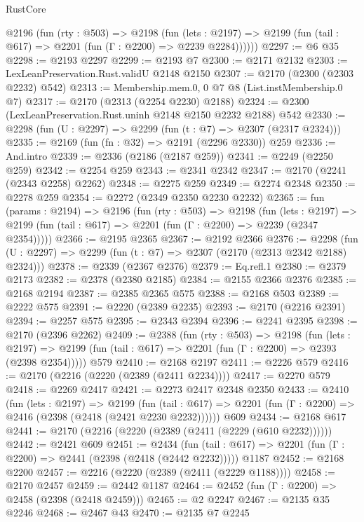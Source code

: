 \begin{lexlean}{RustCore}
\begin{coremodule}
      @2196
        (fun (rty : @503) =>
        @2198
          (fun (lets : @2197) =>
          @2199 (fun (tail : @617) => @2201 (fun (Γ : @2200) => @2239 @2284))))))
@2297 := @6 @35
@2298 := @2193 @2297
@2299 := @2193 @7
@2300 := @2171 @2132
@2303 := LexLeanPreservation.Rust.validU @2148 @2150
@2307 := @2170 (@2300 (@2303 @2232) @542)
@2313 := Membership.mem.{0, 0} @7 @8 (List.instMembership.{0} @7)
@2317 := @2170 (@2313 (@2254 @2230) @2188)
@2324 := @2300 (LexLeanPreservation.Rust.uninh @2148 @2150 @2232 @2188) @542
@2330 := @2298 (fun (U : @2297) => @2299 (fun (t : @7) => @2307 (@2317 @2324)))
@2335 := @2169 (fun (fn : @32) => @2191 (@2296 @2330)) @259
@2336 := And.intro
@2339 := @2336 (@2186 (@2187 @259))
@2341 := @2249 (@2250 @259)
@2342 := @2254 @259
@2343 := @2341 @2342
@2347 := @2170 (@2241 (@2343 @2258) @2262)
@2348 := @2275 @259
@2349 := @2274 @2348
@2350 := @2278 @259
@2354 := @2272 (@2349 @2350 @2230 @2232)
@2365 := fun (params : @2194) =>
  @2196
    (fun (rty : @503) =>
    @2198
      (fun (lets : @2197) =>
      @2199 (fun (tail : @617) => @2201 (fun (Γ : @2200) => @2239 (@2347 @2354)))))
@2366 := @2195 @2365
@2367 := @2192 @2366
@2376 := @2298 (fun (U : @2297) => @2299 (fun (t : @7) => @2307 (@2170 (@2313 @2342 @2188) @2324)))
@2378 := @2339 (@2367 @2376)
@2379 := Eq.refl.{1}
@2380 := @2379 @2173
@2382 := @2378 (@2380 @2185)
@2384 := @2155 @2366 @2376
@2385 := @2168 @2194
@2387 := @2385 @2365 @575
@2388 := @2168 @503
@2389 := @2222 @575
@2391 := @2220 (@2389 @2235)
@2393 := @2170 (@2216 @2391)
@2394 := @2257 @575
@2395 := @2343 @2394
@2396 := @2241 @2395
@2398 := @2170 (@2396 @2262)
@2409 := @2388
    (fun (rty : @503) =>
    @2198
      (fun (lets : @2197) =>
      @2199 (fun (tail : @617) => @2201 (fun (Γ : @2200) => @2393 (@2398 @2354)))))
    @579
@2410 := @2168 @2197
@2411 := @2226 @579
@2416 := @2170 (@2216 (@2220 (@2389 (@2411 @2234))))
@2417 := @2270 @579
@2418 := @2269 @2417
@2421 := @2273 @2417 @2348 @2350
@2433 := @2410
    (fun (lets : @2197) =>
    @2199
      (fun (tail : @617) => @2201 (fun (Γ : @2200) => @2416 (@2398 (@2418 (@2421 @2230 @2232))))))
    @609
@2434 := @2168 @617
@2441 := @2170 (@2216 (@2220 (@2389 (@2411 (@2229 (@610 @2232))))))
@2442 := @2421 @609
@2451 := @2434
    (fun (tail : @617) => @2201 (fun (Γ : @2200) => @2441 (@2398 (@2418 (@2442 @2232)))))
    @1187
@2452 := @2168 @2200
@2457 := @2216 (@2220 (@2389 (@2411 (@2229 @1188))))
@2458 := @2170 @2457
@2459 := @2442 @1187
@2464 := @2452 (fun (Γ : @2200) => @2458 (@2398 (@2418 @2459)))
@2465 := @2 @2247
@2467 := @2135 @35 @2246
@2468 := @2467 @43
@2470 := @2135 @7 @2245

\end{coremodule}
\end{lexlean}
